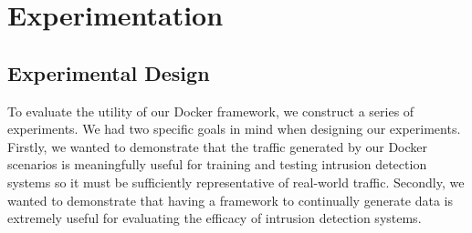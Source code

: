 \documentclass[msc,deptreport, cs]{infthesis} %
\begin{document}
\chapter{Experimentation}
\label{sec:experiments}
\section{Experimental Design}

To evaluate the utility of our Docker framework, we construct a series of experiments. We had two specific goals in mind when designing our experiments. Firstly, we wanted to demonstrate that the traffic generated by our Docker scenarios is meaningfully useful for training and testing intrusion detection systems so it must be sufficiently representative of real-world traffic. Secondly, we wanted to demonstrate that having a framework to continually generate data is extremely useful for evaluating the efficacy of intrusion detection systems.
\end{document}
